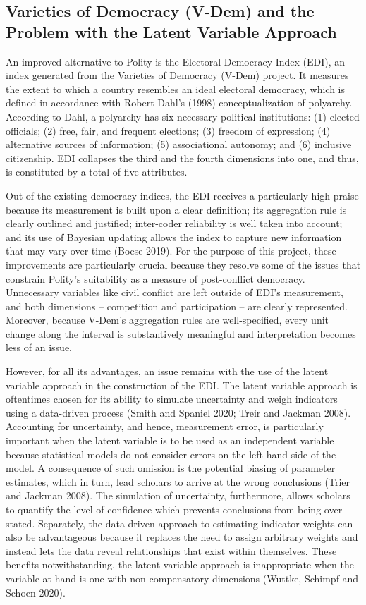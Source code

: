 \documentclass [11pt]{article}
\begin{document}
\subsection*{Varieties of Democracy (V-Dem) and the Problem with the Latent Variable Approach}

An improved alternative to Polity is the Electoral Democracy Index (EDI), an index generated from the Varieties of Democracy (V-Dem) project. It measures the extent to which a country resembles an ideal electoral democracy, which is defined in accordance with Robert Dahl's (1998) conceptualization of polyarchy. According to Dahl, a polyarchy has six necessary political institutions: (1) elected officials; (2) free, fair, and frequent elections; (3) freedom of expression; (4) alternative sources of information; (5) associational autonomy; and (6) inclusive citizenship. EDI collapses the third and the fourth dimensions into one, and thus, is constituted by a total of five attributes.

Out of the existing democracy indices, the EDI receives a particularly high praise because its measurement is built upon a clear definition; its aggregation rule is clearly outlined and justified; inter-coder reliability is well taken into account; and its use of Bayesian updating allows the index to capture new information that may vary over time (Boese 2019). For the purpose of this project, these improvements are particularly crucial because they resolve some of the issues that constrain Polity's suitability as a measure of post-conflict democracy. Unnecessary variables like civil conflict are left outside of EDI's measurement, and both dimensions -- competition and participation -- are clearly represented. Moreover, because V-Dem's aggregation rules are well-specified, every unit change along the interval is substantively meaningful and interpretation becomes less of an issue.

However, for all its advantages, an issue remains with the use of the latent variable approach in the construction of the EDI. The latent variable approach is oftentimes chosen for its ability to simulate uncertainty and weigh indicators using a data-driven process (Smith and Spaniel 2020; Treir and Jackman 2008). Accounting for uncertainty, and hence, measurement error, is particularly important when the latent variable is to be used as an independent variable because statistical models do not consider errors on the left hand side of the model. A consequence of such omission is the potential biasing of parameter estimates, which in turn, lead scholars to arrive at the wrong conclusions (Trier and Jackman 2008). The simulation of uncertainty, furthermore, allows scholars to quantify the level of confidence which prevents conclusions from being over-stated. Separately, the data-driven approach to estimating indicator weights can also be advantageous because it replaces the need to assign arbitrary weights and instead lets the data reveal relationships that exist within themselves. These benefits notwithstanding, the latent variable approach is inappropriate when the variable at hand is one with non-compensatory dimensions (Wuttke, Schimpf and Schoen 2020).
\end{document}

